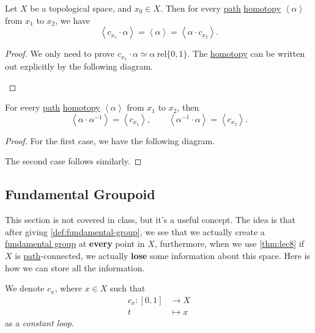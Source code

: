 \begin{lemma}\label{lma:lec8-3}
	Let \(X\) be a topological space, and \(x_0\in X\). Then for every \hyperref[def:path]{path} \hyperref[def:homotopy]{homotopy} \(\left< \alpha  \right> \) from
	\(x_1\) to \(x_2\), we have
	\[
		\left< c_{x_1}\cdot \alpha  \right> = \left< \alpha  \right> = \left< \alpha \cdot c_{x_2} \right>.
	\]
\end{lemma}
\begin{proof}
	We only need to prove \(c_{x_1}\cdot \alpha \simeq \alpha\ \mathrm{rel} \{0,1\} \). The \hyperref[def:homotopy]{homotopy} can be written out explicitly by the following diagram.
	\begin{figure}[H]
		\centering
		\label{fig:pf:lma:lec8-3}
	\end{figure}
\end{proof}

\begin{lemma}\label{lma:lec8-4}
	For every \hyperref[def:path]{path} \hyperref[def:homotopy]{homotopy} \(\left< \alpha  \right> \) from \(x_1\) to \(x_2\), then
	\[
		\left< \alpha \cdot \alpha ^{-1}  \right> = \left< c_{x_1} \right>, \qquad \left< \alpha ^{-1} \cdot \alpha  \right> = \left< c_{x_2} \right>.
	\]
\end{lemma}
\begin{proof}
	For the first case, we have the following diagram.
	\begin{figure}[H]
		\centering
		\label{fig:pf:lma:lec8-4}
	\end{figure}
	The second case follows similarly.
\end{proof}

\subsection{Fundamental Groupoid}
This section is not covered in class, but it's a useful concept. The idea is that after giving \autoref{def:fundamental-group}, we see that we actually create a \hyperref[def:fundamental-group]{fundamental group}
at \textbf{every} point in \(X\), furthermore, when we use \autoref{thm:lec8} if \(X\) is \hyperref[def:path]{path}-connected, we actually \textbf{lose} some
information about this space. Here is how we can store all the information.

\begin{notation}\label{not:constant-loop}
	We denote \(c_x\), where \(x\in X\) such that
	\[
		\begin{split}
			c_{x}\colon [0, 1]&\to X\\
			t&\mapsto x
		\end{split}
	\]
	as a \emph{constant loop}.
\end{notation}

